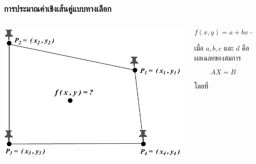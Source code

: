 \documentclass[12pt,aspectratio=169]{beamer}
\begin{document}
    \begin{frame}
        \frametitle{การประมาณค่าเชิงเส้นคู่แบบทางเลือก}
        \begin{columns}
            \begin{column}{0.42\textwidth}  
                \includegraphics[width=1.2\textwidth]{img/region-selection-one-point.pdf}
            \end{column}
            \begin{column}{0.5\textwidth}
                \begin{equation}
                    f(x,y)=a+bx+cy+dxy
               \end{equation}

               เมื่อ $a,b,c$ และ $d$ คือผลเฉลยของสมการ 
            
               \begin{equation}\label{solve-by-cramer-equation}
                  AX = B  
               \end{equation}
               
               โดยที่
               

\end{column}
\end{columns}
\end{frame}
\end{document}
